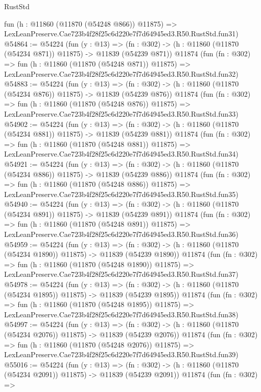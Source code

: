 \begin{lexlean}{RustStd}
\begin{coremodule}
    fun (h : @11860 (@11870 (@54248 @866)) @11875) =>
    LexLeanPreserve.Cae723b4f28f25c6d220e7f7d64945ed3.R50.RustStd.fun31)
@54864 := @54224
    (fun (y : @13) =>
    (fn : @302) -> (h : @11860 (@11870 (@54234 @871)) @11875) -> @11839 (@54239 @871))
    @11874
    (fun (fn : @302) =>
    fun (h : @11860 (@11870 (@54248 @871)) @11875) =>
    LexLeanPreserve.Cae723b4f28f25c6d220e7f7d64945ed3.R50.RustStd.fun32)
@54883 := @54224
    (fun (y : @13) =>
    (fn : @302) -> (h : @11860 (@11870 (@54234 @876)) @11875) -> @11839 (@54239 @876))
    @11874
    (fun (fn : @302) =>
    fun (h : @11860 (@11870 (@54248 @876)) @11875) =>
    LexLeanPreserve.Cae723b4f28f25c6d220e7f7d64945ed3.R50.RustStd.fun33)
@54902 := @54224
    (fun (y : @13) =>
    (fn : @302) -> (h : @11860 (@11870 (@54234 @881)) @11875) -> @11839 (@54239 @881))
    @11874
    (fun (fn : @302) =>
    fun (h : @11860 (@11870 (@54248 @881)) @11875) =>
    LexLeanPreserve.Cae723b4f28f25c6d220e7f7d64945ed3.R50.RustStd.fun34)
@54921 := @54224
    (fun (y : @13) =>
    (fn : @302) -> (h : @11860 (@11870 (@54234 @886)) @11875) -> @11839 (@54239 @886))
    @11874
    (fun (fn : @302) =>
    fun (h : @11860 (@11870 (@54248 @886)) @11875) =>
    LexLeanPreserve.Cae723b4f28f25c6d220e7f7d64945ed3.R50.RustStd.fun35)
@54940 := @54224
    (fun (y : @13) =>
    (fn : @302) -> (h : @11860 (@11870 (@54234 @891)) @11875) -> @11839 (@54239 @891))
    @11874
    (fun (fn : @302) =>
    fun (h : @11860 (@11870 (@54248 @891)) @11875) =>
    LexLeanPreserve.Cae723b4f28f25c6d220e7f7d64945ed3.R50.RustStd.fun36)
@54959 := @54224
    (fun (y : @13) =>
    (fn : @302) -> (h : @11860 (@11870 (@54234 @1890)) @11875) -> @11839 (@54239 @1890))
    @11874
    (fun (fn : @302) =>
    fun (h : @11860 (@11870 (@54248 @1890)) @11875) =>
    LexLeanPreserve.Cae723b4f28f25c6d220e7f7d64945ed3.R50.RustStd.fun37)
@54978 := @54224
    (fun (y : @13) =>
    (fn : @302) -> (h : @11860 (@11870 (@54234 @1895)) @11875) -> @11839 (@54239 @1895))
    @11874
    (fun (fn : @302) =>
    fun (h : @11860 (@11870 (@54248 @1895)) @11875) =>
    LexLeanPreserve.Cae723b4f28f25c6d220e7f7d64945ed3.R50.RustStd.fun38)
@54997 := @54224
    (fun (y : @13) =>
    (fn : @302) -> (h : @11860 (@11870 (@54234 @2076)) @11875) -> @11839 (@54239 @2076))
    @11874
    (fun (fn : @302) =>
    fun (h : @11860 (@11870 (@54248 @2076)) @11875) =>
    LexLeanPreserve.Cae723b4f28f25c6d220e7f7d64945ed3.R50.RustStd.fun39)
@55016 := @54224
    (fun (y : @13) =>
    (fn : @302) -> (h : @11860 (@11870 (@54234 @2091)) @11875) -> @11839 (@54239 @2091))
    @11874
    (fun (fn : @302) =>

\end{coremodule}
\end{lexlean}

